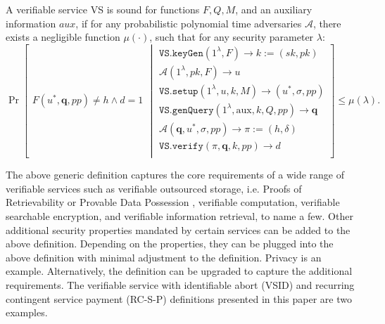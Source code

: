 \begin{definition}[VS Soundness] A verifiable service VS is sound  for  functions $F,Q,M$, and an auxiliary information $aux$, if for any probabilistic polynomial time adversaries $\mathcal{A}$, there exists a negligible function $\mu(\cdot)$, such that for any security parameter $\lambda$: 
\small{
$$ \Pr\left[
  \begin{array}{l}
F(u^{\scriptscriptstyle *},\bm{q},{pp})\neq h \wedge d=1
\end{array} \middle | 
    \begin{array} {l}
 \mathtt{VS.keyGen}(1^{\lambda},F)\rightarrow k:=(sk,pk)\\
 \mathcal{A}(1^{\scriptscriptstyle\lambda},pk, F)\rightarrow u\\
\mathtt{VS.setup}(1^{\lambda}, u,k,M)\rightarrow (u^{\scriptscriptstyle *},\sigma, {pp})\\
 \mathtt{VS.genQuery}(1^{\lambda}, \text{aux},k,Q,{pp})\rightarrow \bm{q}\\
 \mathcal{A}(\bm{q},u^{\scriptscriptstyle *},\sigma,{pp})\rightarrow \pi:=(h,\delta)\\
 \mathtt{VS.verify}(\pi,\bm{q},k,{pp})\rightarrow d\\
\end{array}    \right]\leq \mu(\lambda).$$
}
\end{definition}




The above generic definition captures the core requirements of a wide range of verifiable services such as verifiable outsourced storage, i.e. Proofs of Retrievability \cite{DBLP:journals/iacr/JuelsK07,DBLP:conf/asiacrypt/ShachamW08} or Provable Data Possession \cite{DBLP:conf/ccs/AtenieseBCHKPS07,ShenT11}, verifiable computation, verifiable searchable encryption, and verifiable information retrieval, to name a few. Other additional  security properties mandated by certain services can be added to the above definition. Depending on the properties,  they can be  plugged into  the above definition with minimal adjustment to the definition. Privacy is an example. Alternatively, the definition can be upgraded to capture the  additional requirements.  The verifiable service with identifiable abort (VSID) and recurring contingent service payment (RC-S-P) definitions presented in this paper are two examples. 


